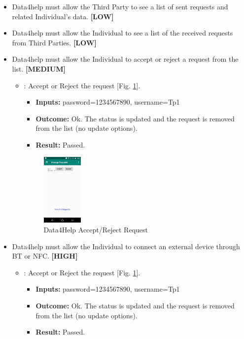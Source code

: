 \documentclass[a4paper, hidelinks, 12pt]{report}
\newcommand\requirement[1]{\item[{[REQ-#1]}] }
\newcommand\test[1]{\item[{[TEST-#1]}] }
\begin{document}
\begin{itemize}
\begin{itemize}
	\end{itemize}
	
	
	\requirement{14} Data4help must allow the Third Party to see a list of sent requests and related Individual’s data. \textbf{[LOW]}
	\requirement{15} Data4help must allow the Individual to see a list of the received requests from Third Parties. \textbf{[LOW]}
	\requirement{16} Data4help must allow the Individual to accept or reject a request from the list. \textbf{[MEDIUM]}
			
				\begin{itemize}
		\test{13}: Accept or Reject the request [Fig. \ref{fig:request_acceptreject}].
			\begin{itemize}
			\item \textbf{Inputs: } password=1234567890, username=Tp1			
			\item \textbf{Outcome: } Ok. The status is updated and the request is removed from the list (no update options).
			\item \textbf{Result: } Passed. 
			\end{itemize}
			
			
		\begin{figure}[H]
					\centering
				\includegraphics[width=0.2\textwidth]{images/manage_requests.jpeg}
					\caption[Data4Help Accept/Reject Request]{Data4Help Accept/Reject Request}
				\label{fig:request_acceptreject}
			\end{figure}
			

	\end{itemize}
	
	\requirement{17} Data4help must allow the Individual to connect an external device through BT or NFC. \textbf{[HIGH]}
	\begin{itemize}
		\test{13}: Accept or Reject the request [Fig. \ref{fig:request_acceptreject}].
			\begin{itemize}
			\item \textbf{Inputs: } password=1234567890, username=Tp1			
			\item \textbf{Outcome: } Ok. The status is updated and the request is removed from the list (no update options).
			\item \textbf{Result: } Passed. 
			\end{itemize}
	\end{itemize}
	\end{itemize}
\end{document}
